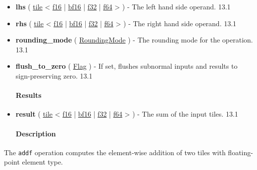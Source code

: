 \documentclass{article}
\begin{document}
\begin{itemize}
\item \textbf{lhs} ( \href{https://docs.nvidia.com/cuda/tile-ir/latest/sections/types.html#type-tile}{tile} < \href{https://docs.nvidia.com/cuda/tile-ir/latest/sections/types.html#subsection-element-types}{f16} | \href{https://docs.nvidia.com/cuda/tile-ir/latest/sections/types.html#subsection-element-types}{bf16} | \href{https://docs.nvidia.com/cuda/tile-ir/latest/sections/types.html#subsection-element-types}{f32} | \href{https://docs.nvidia.com/cuda/tile-ir/latest/sections/types.html#subsection-element-types}{f64} > ) - The left hand side operand. 13.1
\item \textbf{rhs} ( \href{https://docs.nvidia.com/cuda/tile-ir/latest/sections/types.html#type-tile}{tile} < \href{https://docs.nvidia.com/cuda/tile-ir/latest/sections/types.html#subsection-element-types}{f16} | \href{https://docs.nvidia.com/cuda/tile-ir/latest/sections/types.html#subsection-element-types}{bf16} | \href{https://docs.nvidia.com/cuda/tile-ir/latest/sections/types.html#subsection-element-types}{f32} | \href{https://docs.nvidia.com/cuda/tile-ir/latest/sections/types.html#subsection-element-types}{f64} > ) - The right hand side operand. 13.1
\item \textbf{rounding\_mode} ( \href{https://docs.nvidia.com/cuda/tile-ir/latest/sections/operations.html#op-attribute-cuda-tile-addf-roundingmode-attr}{RoundingMode} ) - The rounding mode for the operation. 13.1
\item \textbf{flush\_to\_zero} ( \href{https://docs.nvidia.com/cuda/tile-ir/latest/sections/operations.html#type-flag}{Flag} ) - If set, flushes subnormal inputs and results to sign-preserving zero. 13.1


\paragraph{Results}

\item \textbf{result} ( \href{https://docs.nvidia.com/cuda/tile-ir/latest/sections/types.html#type-tile}{tile} < \href{https://docs.nvidia.com/cuda/tile-ir/latest/sections/types.html#subsection-element-types}{f16} | \href{https://docs.nvidia.com/cuda/tile-ir/latest/sections/types.html#subsection-element-types}{bf16} | \href{https://docs.nvidia.com/cuda/tile-ir/latest/sections/types.html#subsection-element-types}{f32} | \href{https://docs.nvidia.com/cuda/tile-ir/latest/sections/types.html#subsection-element-types}{f64} > ) - The sum of the input tiles. 13.1


\paragraph{Description}

\end{itemize}
The \texttt{addf} operation computes the element-wise addition of two tiles with floating-point element type.
\end{document}
